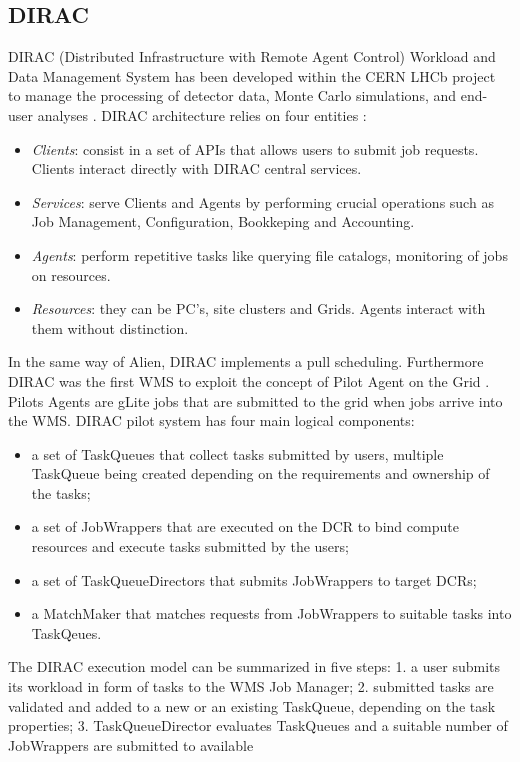 \subsection{DIRAC} 
DIRAC (Distributed Infrastructure with Remote Agent Control) Workload and Data Management System has been developed within the CERN LHCb project to manage the processing of detector data, Monte Carlo simulations, and end-user analyses \cite{Tsaregorodtsev2004}. 
DIRAC  architecture relies on four entities \cite{Paterson2010}:
\begin{itemize}
\item \emph{Clients}: consist in a set of APIs that allows users to submit job requests. Clients interact directly with DIRAC central services.
\item \emph{Services}: serve Clients and Agents by performing crucial operations such as Job Management, Configuration, Bookkeping and Accounting.
\item \emph{Agents}: perform repetitive tasks like querying file catalogs,  monitoring of jobs on resources.
\item \emph{Resources}: they can be PC's, site clusters and Grids. Agents interact with them without distinction.
\end{itemize}
In the same way of Alien, DIRAC implements a pull scheduling. Furthermore DIRAC was the first WMS to exploit the concept of Pilot Agent on the Grid \cite{Casajus2010}. 
Pilots Agents are gLite jobs that are submitted to the grid when jobs arrive into the WMS. 
DIRAC pilot system has four main logical components:
\begin{itemize}
\item a set of TaskQueues that collect tasks submitted by users, multiple TaskQueue being created depending on the requirements and ownership of the tasks;
\item a set of JobWrappers that are executed on the DCR to bind compute resources and execute tasks submitted by the users;
\item a set of TaskQueueDirectors that submits JobWrappers to target DCRs;
\item a MatchMaker that matches requests from JobWrappers to suitable tasks into TaskQeues.
\end{itemize}
The DIRAC execution model can be summarized in five
steps: 1. a user submits its workload in form of tasks to the WMS Job Manager; 2. submitted tasks are validated and added to a new or an existing TaskQueue, depending on the task properties; 3. TaskQueueDirector evaluates TaskQueues and a suitable number of JobWrappers are submitted to available
